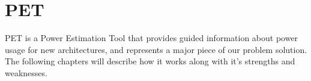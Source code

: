\chapter{PET}
PET is a Power Estimation Tool that provides guided information about power usage
for new architectures, and represents a major piece of our problem solution. The following chapters
will describe how it works along with it's strengths and weaknesses.



